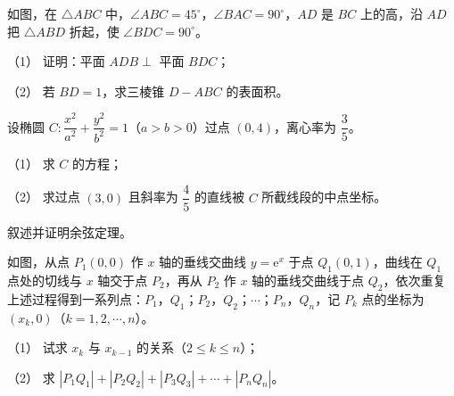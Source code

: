 \Needspace{0.4\textheight}
\begin{question}
如图，在 $\triangle ABC$ 中，$\angle ABC=45^\circ$，$\angle BAC=90^\circ$，$AD$ 是 $BC$ 上的高，沿 $AD$ 把 $\triangle ABD$ 折起，使 $\angle BDC=90^\circ$。

（1） 证明：平面 $ADB\perp$ 平面 $BDC$；

（2） 若 $BD=1$，求三棱锥 $D-ABC$ 的表面积。
\nopagebreak[4]
\begin{center}\end{center}
\nopagebreak[4]
\end{question}
\begin{question}
设椭圆 $C:\dfrac{x^2}{a^2}+\dfrac{y^2}{b^2}=1$（$a>b>0$）过点 $(0,4)$，离心率为 $\dfrac35$。

（1） 求 $C$ 的方程；

（2） 求过点 $(3,0)$ 且斜率为 $\dfrac45$ 的直线被 $C$ 所截线段的中点坐标。

\end{question}
\begin{question}
叙述并证明余弦定理。

\Needspace{0.4\textheight}
\end{question}
\begin{question}
如图，从点 $P_1(0,0)$ 作 $x$ 轴的垂线交曲线 $y=\mathrm e^x$ 于点 $Q_1(0,1)$，曲线在 $Q_1$ 点处的切线与 $x$ 轴交于点 $P_2$，再从 $P_2$ 作 $x$ 轴的垂线交曲线于点 $Q_2$，依次重复上述过程得到一系列点：$P_1$，$Q_1$；$P_2$，$Q_2$；$\cdots$；$P_n$，$Q_n$，记 $P_k$ 点的坐标为 $(x_k,0)$（$k=1,2,\cdots,n$）。

（1） 试求 $x_k$ 与 $x_{k-1}$ 的关系（$2\leqslant k\leqslant n$）；

（2） 求 $|P_1Q_1|+|P_2Q_2|+|P_3Q_3|+\cdots+|P_nQ_n|$。
\nopagebreak[4]
\begin{center}\end{center}
\nopagebreak[4]
\Needspace{0.4\textheight}
\end{question}
